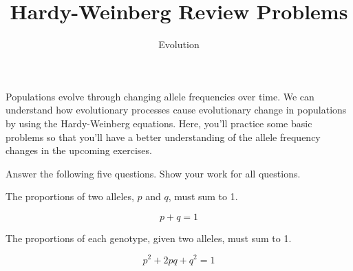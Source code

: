 \documentclass[11pt]{article}
\title{Hardy-Weinberg Review Problems}
\author{Evolution}
\date{}                                           %
\newcommand{\VSpace}{\vspace{\baselineskip}}
\begin{document}
\maketitle

Populations evolve through changing allele frequencies over time. We can understand how evolutionary processes cause evolutionary change in populations by using the Hardy-Weinberg equations. Here, you'll practice some basic problems so that you'll have a better understanding of the allele frequency changes in the upcoming exercises.\VSpace

Answer the following five questions. Show your work for all questions. \VSpace

The proportions of two alleles, $p$ and $q$, must sum to 1.

 \[p + q = 1\]

The proportions of each genotype, given two alleles, must sum to 1.


\[p^2 + 2pq + q^2 = 1\]
\end{document}
